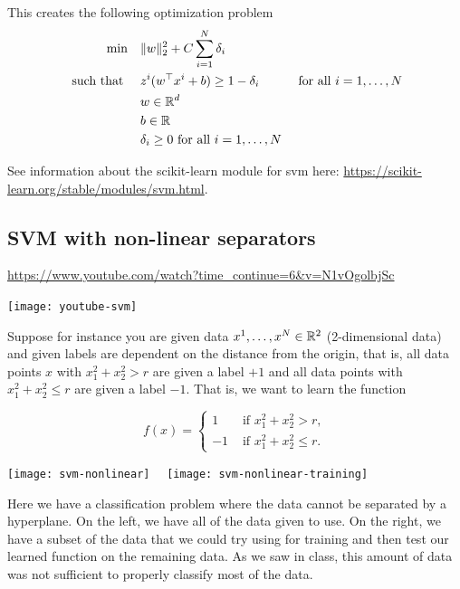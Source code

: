 \documentclass[../open-optimization/open-optimization.tex]{subfiles}
\begin{document}
This creates the following optimization problem
\begin{align*}
\min \quad & \|w\|_2^2+ C \sum_{i=1}^N \delta_i \\
\text{ such that } \quad & z^i( w^\top x^i + b) \geq 1  - \delta_i& \text{ for all } i=1, \dots, N\\
& w  \in {\mathbb{R}}^d\\
& b \in {\mathbb{R}}\\
& \delta_i \geq 0  \text { for all } i =1, \dots, N
\end{align*}


See information about the scikit-learn module for svm here:
\url{https://scikit-learn.org/stable/modules/svm.html}.

\subsection{SVM with non-linear separators}




\url{https://www.youtube.com/watch?time_continue=6&v=N1vOgolbjSc}

\texttt{[image: youtube-svm]}



Suppose for instance you are given data $x^1, \dots, x^N \in {\mathbb{R}}^2$ (2-dimensional data) and given labels are dependent on the distance from the origin, that is,  all data points $x$ with  $x_1^2 + x_2^2 > r$ are given a label $+1$ and all data points with $x_1^2 + x_2^2 \leq r$ are given a label $-1$.   That is, we want to learn the function 

\begin{equation}
f(x) = \begin{cases}
1 & \text{ if } x_1^2 + x_2^2 >  r,\\
-1 & \text{ if } x_1^2 + x_2^2 \leq r.
\end{cases}
\end{equation}

\begin{example}
\begin{center}
\texttt{[image: svm-nonlinear]} \ \ \texttt{[image: svm-nonlinear-training]}
\end{center}
Here we have a classification problem where the data cannot be separated by a hyperplane.  On the left, we have all of the data given to use.  On the right, we have a subset of the data that we could try using for training and then test our learned function on the remaining data.  As we saw in class, this amount of data was not sufficient to properly classify most of the data.
\end{example}
\end{document}
